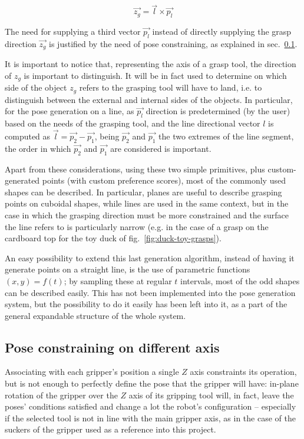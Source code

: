 \begin{equation}
  \vec{z_{g}}=\vec{l} \times \vec{p_l}
\end{equation}

The need for supplying a third vector $\vec{p_l}$ instead of directly
supplying the grasp direction $\vec{z_g}$ is justified by the need of
pose constraining, as explained in sec.~\ref{sec:pose-constraining}.


It is important to notice that, representing the axis of a grasp tool,
the direction of $z_g$ is important to distinguish. It will be in fact
used to determine on which side of the object $z_g$ refers to the
grasping tool will have to land, i.e. to distinguish between the
external and internal sides of the objects. In particular, for the
pose generation on a line, as $\vec{p_l}$ direction is predetermined
(by the user) based on the needs of the grasping tool, and the line
directional vector $l$ is computed as $\vec{l}=\vec{p_2}-\vec{p_1}$,
being $\vec{p_2}$ and $\vec{p_1}$ the two extremes of the line
segment, the order in which $\vec{p_2}$ and $\vec{p_1}$ are considered
is important.

Apart from these considerations, using these two simple primitives,
plus custom-generated points (with custom preference scores), most of
the commonly used shapes can be described. In particular, planes are
useful to describe grasping points on cuboidal shapes, while lines are
used in the same context, but in the case in which the grasping
direction must be more constrained and the surface the line refers to
is particularly narrow (e.g. in the case of a grasp on the cardboard
top for the toy duck of fig.~\ref{fig:duck-toy-grasps}).

An easy possibility to extend this last generation algorithm, instead
of having it generate points on a straight line, is the use of
parametric functions $(x,y)=f(t)$; by sampling these at regular $t$
intervals, most of the odd shapes can be described easily. This has
not been implemented into the pose generation system, but the
possibility to do it easily has been left into it, as a part of the
general expandable structure of the whole system.

\subsection{Pose constraining on different axis} \label{sec:pose-constraining}
Associating with each gripper's position a single $Z$ axis constraints
its operation, but is not enough to perfectly define the pose that the
gripper will have: in-plane rotation of the gripper over the $Z$ axis
of its gripping tool will, in fact, leave the poses' conditions
satisfied and change a lot the robot's configuration -- especially if
the selected tool is not in line with the main gripper axis, as in the
case of the suckers of the gripper used as a reference into this
project.

